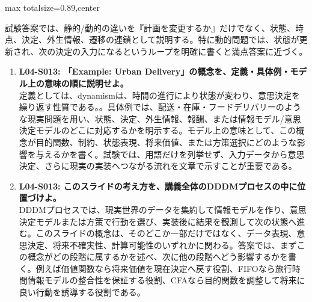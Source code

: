 \begin{minipage}[t]{0.58\textwidth}
\begin{adjustbox}{max totalsize={\textwidth}{0.89\textheight},center}
\begin{minipage}{\textwidth}
試験答案では、静的/動的の違いを『計画を変更するか』だけでなく、状態、時点、決定、外生情報、遷移の連鎖として説明する。特に動的問題では、状態が更新され、次の決定の入力になるというループを明確に書くと満点答案に近づく。\par{}\begin{enumerate}\item \textbf{L04-S013: 「Example: Urban Delivery」の概念を、定義・具体例・モデル上の意味の順に説明せよ。}\\定義としては、dynamismは、時間の進行により状態が変わり、意思決定を繰り返す性質である。。具体例では、配送・在庫・フードデリバリーのような現実問題を用い、状態、決定、外生情報、報酬、または情報モデル/意思決定モデルのどこに対応するかを明示する。モデル上の意味として、この概念が目的関数、制約、状態表現、将来価値、または方策選択にどのような影響を与えるかを書く。試験では、用語だけを列挙せず、入力データから意思決定、さらに現実の実装へつながる流れを文章で示すことが重要である。\item \textbf{L04-S013: このスライドの考え方を、講義全体のDDDMプロセスの中に位置づけよ。}\\DDDMプロセスでは、現実世界のデータを集約して情報モデルを作り、意思決定モデルまたは方策で行動を選び、実装後に結果を観測して次の状態へ進む。このスライドの概念は、そのどこか一部だけではなく、データ表現、意思決定、将来不確実性、計算可能性のいずれかに関わる。答案では、まずこの概念がどの段階に属するかを述べ、次に他の段階へどう影響するかを書く。例えば価値関数なら将来価値を現在決定へ戻す役割、FIFOなら旅行時間情報モデルの整合性を保証する役割、CFAなら目的関数を調整して将来に良い行動を誘導する役割である。\end{enumerate}
\end{minipage}
\end{adjustbox}
\end{minipage}



